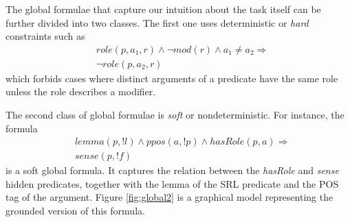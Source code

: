 The global formulae that capture our intuition about the task itself can be further divided into two classes. The first one uses deterministic or \emph{hard} constraints such as
\begin{eqnarray*}
 &role\left(p,a_{1},r\right)\wedge \neg mod\left(r\right)\wedge a_{1}\neq a_{2}  \Rightarrow\\
  & \neg role\left(p,a_{2},r\right)
\end{eqnarray*}
which forbids cases where distinct arguments of a predicate have the same role unless the role describes a modifier.

The second class of global formulae is \emph{soft} or nondeterministic. For instance, the formula  
\begin{eqnarray*}
  & lemma(p,!l) \wedge ppos(a,!p) \wedge hasRole(p,a)  \Rightarrow \\
  & sense(p,!f) 
\end{eqnarray*}
is a soft global formula. It captures the relation between the \emph{hasRole} and \emph{sense} hidden predicates, together with the lemma of the SRL predicate and the POS tag of the argument. Figure \ref{fig:global2} is a graphical model representing the grounded version of this formula. %

